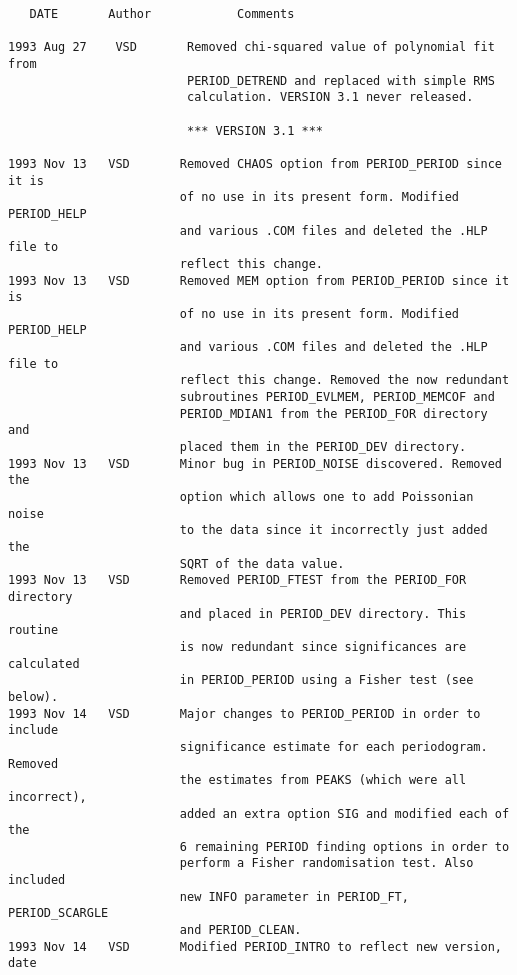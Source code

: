 \begin{verbatim}
\end{verbatim}


\newpage


\begin{verbatim}
   DATE       Author            Comments

1993 Aug 27    VSD       Removed chi-squared value of polynomial fit from
                         PERIOD_DETREND and replaced with simple RMS
                         calculation. VERSION 3.1 never released.

                         *** VERSION 3.1 ***

1993 Nov 13   VSD       Removed CHAOS option from PERIOD_PERIOD since it is
                        of no use in its present form. Modified PERIOD_HELP
                        and various .COM files and deleted the .HLP file to
                        reflect this change.
1993 Nov 13   VSD       Removed MEM option from PERIOD_PERIOD since it is
                        of no use in its present form. Modified PERIOD_HELP
                        and various .COM files and deleted the .HLP file to
                        reflect this change. Removed the now redundant
                        subroutines PERIOD_EVLMEM, PERIOD_MEMCOF and
                        PERIOD_MDIAN1 from the PERIOD_FOR directory and
                        placed them in the PERIOD_DEV directory.
1993 Nov 13   VSD       Minor bug in PERIOD_NOISE discovered. Removed the
                        option which allows one to add Poissonian noise
                        to the data since it incorrectly just added the
                        SQRT of the data value.
1993 Nov 13   VSD       Removed PERIOD_FTEST from the PERIOD_FOR directory
                        and placed in PERIOD_DEV directory. This routine
                        is now redundant since significances are calculated
                        in PERIOD_PERIOD using a Fisher test (see below).
1993 Nov 14   VSD       Major changes to PERIOD_PERIOD in order to include
                        significance estimate for each periodogram. Removed
                        the estimates from PEAKS (which were all incorrect),
                        added an extra option SIG and modified each of the
                        6 remaining PERIOD finding options in order to
                        perform a Fisher randomisation test. Also included
                        new INFO parameter in PERIOD_FT, PERIOD_SCARGLE
                        and PERIOD_CLEAN.
1993 Nov 14   VSD       Modified PERIOD_INTRO to reflect new version, date

\end{verbatim}
